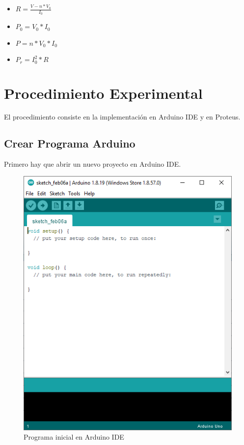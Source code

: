 \documentclass{article}
\begin{document}
    \begin{itemize}
        \item $R = \frac{V - n*V_0}{I_0}$
        \item $P_0 = V_0 * I_0$
        \item $P = n * V_0 * I_0$
        \item $P_r = I_0^2 * R$
    \end{itemize}

    \section{Procedimiento Experimental}\label{sec:procedimiento-experimental}

    El procedimiento consiste en la implementación en Arduino IDE y en Proteus.

    \subsection{Crear Programa Arduino}\label{subsec:crear-programa-arduino}

    Primero hay que abrir un nuevo proyecto en Arduino IDE.

    \begin{figure}[H]
        \centering
        \includegraphics[width=0.3\paperwidth]{images/arduino-1}
        \caption{Programa inicial en Arduino IDE}\label{fig:figure2}
    \end{figure}
\end{document}
